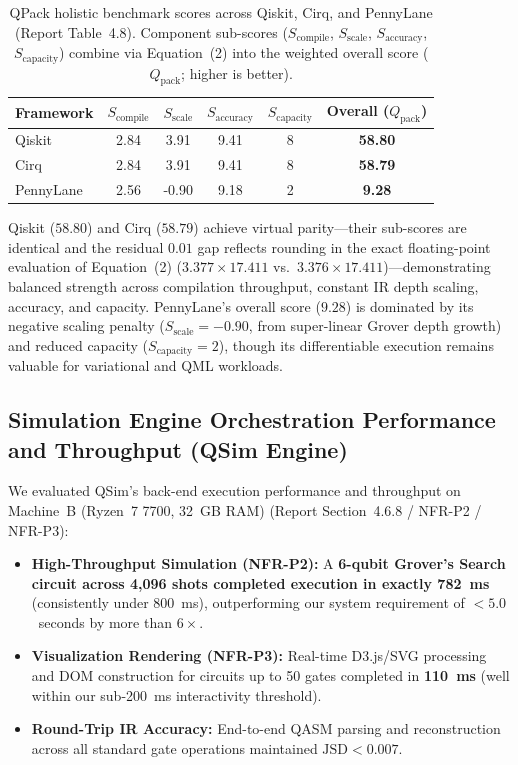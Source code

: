 \documentclass[runningheads]{llncs}
\begin{document}
\begin{table}[htbp]
\centering
\caption{QPack holistic benchmark scores across Qiskit, Cirq, and PennyLane (Report Table~4.8). Component sub-scores ($S_{\text{compile}}$, $S_{\text{scale}}$, $S_{\text{accuracy}}$, $S_{\text{capacity}}$) combine via Equation~(2) into the weighted overall score ($Q_{\text{pack}}$; higher is better).}
\label{tab:qpack}
\renewcommand{\arraystretch}{1.15}
\setlength{\tabcolsep}{10pt}
\begin{tabular}{@{}l c c c c c@{}}
\toprule
\textbf{Framework} & $S_{\text{compile}}$ & $S_{\text{scale}}$ & $S_{\text{accuracy}}$ & $S_{\text{capacity}}$ & \textbf{Overall ($Q_{\text{pack}}$)} \\
\midrule
Qiskit     & 2.84 &  3.91 & 9.41 & 8 & \textbf{58.80} \\
Cirq       & 2.84 &  3.91 & 9.41 & 8 & \textbf{58.79} \\
PennyLane  & 2.56 & -0.90 & 9.18 & 2 &  \textbf{9.28} \\
\bottomrule
\end{tabular}
\end{table}

Qiskit ($\mathbf{58.80}$) and Cirq ($\mathbf{58.79}$) achieve virtual parity---their sub-scores are identical and the residual $0.01$ gap reflects rounding in the exact floating-point evaluation of Equation~(2) ($3.377 \times 17.411$ vs.\ $3.376 \times 17.411$)---demonstrating balanced strength across compilation throughput, constant IR depth scaling, accuracy, and capacity. PennyLane's overall score ($\mathbf{9.28}$) is dominated by its negative scaling penalty ($S_{\text{scale}} = -0.90$, from super-linear Grover depth growth) and reduced capacity ($S_{\text{capacity}} = 2$), though its differentiable execution remains valuable for variational and QML workloads.

\subsection{Simulation Engine Orchestration Performance and Throughput (QSim Engine)}

We evaluated QSim's back-end execution performance and throughput on Machine~B (Ryzen~7 7700, 32~GB RAM) (Report Section~4.6.8 / NFR-P2 / NFR-P3):
\begin{itemize}
    \item \textbf{High-Throughput Simulation (NFR-P2):} A \textbf{6-qubit Grover's Search circuit across 4,096 shots completed execution in exactly 782~ms} (consistently under 800~ms), outperforming our system requirement of $<5.0$~seconds by more than $6\times$.
    \item \textbf{Visualization Rendering (NFR-P3):} Real-time D3.js/SVG processing and DOM construction for circuits up to 50 gates completed in \textbf{110~ms} (well within our sub-200~ms interactivity threshold).
    \item \textbf{Round-Trip IR Accuracy:} End-to-end QASM parsing and reconstruction across all standard gate operations maintained $\text{JSD} < 0.007$.
\end{itemize}
\end{document}
